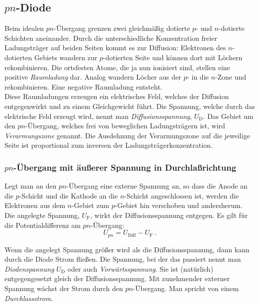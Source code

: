 \subsection{$pn$-Diode}

Beim idealen $pn$-Übergang grenzen zwei gleichmäßig dotierte $p$-
und $n$-dotierte Schichten aneinander. Durch die unterschiedliche
Konzentration freier Ladungsträger auf beiden Seiten kommt es zur
Diffusion: Elektronen des $n$-dotierten Gebiets wandern zur
$p$-dotierten Seite und können dort mit Löchern rekombinieren. Die 
ortsfesten Atome, die ja nun ionisiert sind, stellen eine
positive {\it Raumladung} dar. Analog wandern Löcher aus der
$p$- in die $n$-Zone und rekombinieren. Eine negative Raumladung
entsteht.\\
Diese Raumladungen erzeugen ein elektrisches Feld,
welches der Diffusion entgegenwirkt und zu einem Gleichgewicht
führt. Die Spannung, welche durch das elektrische Feld erzeugt
wird, nennt man {\it Diffusionsspannung}, $U_{\mathrm{D}}$. Das Gebiet
um den $pn$-Übergang, welches frei von beweglichen Ladungsträgern
 ist, wird {\it Verarmungszone} genannt. 
Die Ausdehnung der Verarmungszone auf die
jeweilige Seite ist proportional zum inversen der
Ladungsträgerkonzentration.

\subsubsection{$pn$-Übergang mit äußerer Spannung in Durchlaßrichtung}

Legt man an den $pn$-Übergang eine externe Spannung an, so dass die
Anode an die $p$-Schicht und die Kathode an die $n$-Schicht
angeschlossen ist, werden die Elektronen aus dem $n$-Gebiet zum
$p$-Gebiet hin verschoben und andersherum. Die angelegte Spannung,
$U_{\mathrm{F}}$, wirkt der Diffusionsspannung entgegen. Es gilt für
die Potentialdifferenz am $pn$-Übergang:
%
\begin{equation}
U_{pn} = U_{\mathrm{Diff}} - U_{\mathrm{F}} \, .
\end{equation}

\noindent
Wenn die angelegt Spannung größer wird als die Diffusionsspannung, dann kann durch die Diode Strom fließen. Die Spannung, bei der das passiert nennt man \textit{Diodenspannung} $U_{\mathrm{D}}$ oder auch \textit{Vorwärtsspannung}. Sie ist (natürlich) entgegengesetzt gleich der Diffusionsspannung.
Mit zunehmender externer Spannung wächst der Strom durch den $pn$-Übergang. Man spricht von einem {\it Durchlassstrom}.

